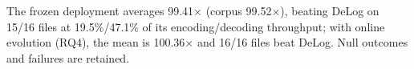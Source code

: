 The frozen deployment averages 99.41$\times$ (corpus 99.52$\times$), beating DeLog on 15/16 files at 19.5\%/47.1\% of its encoding/decoding throughput; with online evolution (RQ4), the mean is 100.36$\times$ and 16/16 files beat DeLog. Null outcomes and failures are retained.
